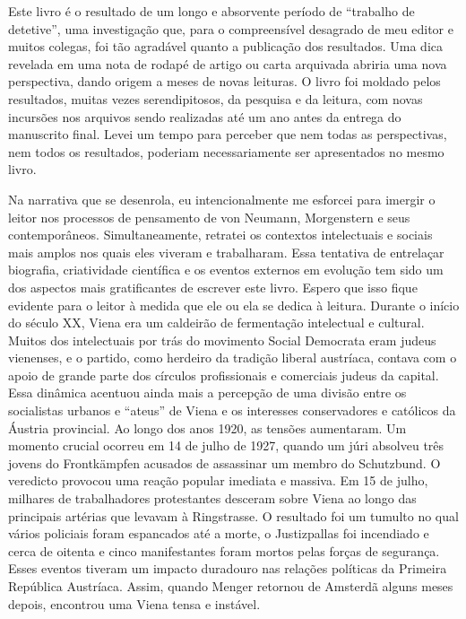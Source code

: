\documentclass[a4paper,12pt]{article}[abntex2]
\begin{document}
Este livro é o resultado de um longo e absorvente período de “trabalho de detetive”, uma investigação que, para o compreensível desagrado de meu editor e muitos colegas, foi tão agradável quanto a publicação dos resultados. Uma dica revelada em uma nota de rodapé de artigo ou carta arquivada abriria uma nova perspectiva, dando origem a meses de novas leituras. O livro foi moldado pelos resultados, muitas vezes serendipitosos, da pesquisa e da leitura, com novas incursões nos arquivos sendo realizadas até um ano antes da entrega do manuscrito final. Levei um tempo para perceber que nem todas as perspectivas, nem todos os resultados, poderiam necessariamente ser apresentados no mesmo livro.

Na narrativa que se desenrola, eu intencionalmente me esforcei para imergir o leitor nos processos de pensamento de von Neumann, Morgenstern e seus contemporâneos. Simultaneamente, retratei os contextos intelectuais e sociais mais amplos nos quais eles viveram e trabalharam. Essa tentativa de entrelaçar biografia, criatividade científica e os eventos externos em evolução tem sido um dos aspectos mais gratificantes de escrever este livro. Espero que isso fique evidente para o leitor à medida que ele ou ela se dedica à leitura. Durante o início do século XX, Viena era um caldeirão de fermentação intelectual e cultural. Muitos dos intelectuais por trás do movimento Social Democrata eram judeus vienenses, e o partido, como herdeiro da tradição liberal austríaca, contava com o apoio de grande parte dos círculos profissionais e comerciais judeus da capital. Essa dinâmica acentuou ainda mais a percepção de uma divisão entre os socialistas urbanos e “ateus” de Viena e os interesses conservadores e católicos da Áustria provincial. Ao longo dos anos 1920, as tensões aumentaram. Um momento crucial ocorreu em 14 de julho de 1927, quando um júri absolveu três jovens do Frontkämpfen acusados de assassinar um membro do Schutzbund. O veredicto provocou uma reação popular imediata e massiva. Em 15 de julho, milhares de trabalhadores protestantes desceram sobre Viena ao longo das principais artérias que levavam à Ringstrasse. O resultado foi um tumulto no qual vários policiais foram espancados até a morte, o Justizpallas foi incendiado e cerca de oitenta e cinco manifestantes foram mortos pelas forças de segurança. Esses eventos tiveram um impacto duradouro nas relações políticas da Primeira República Austríaca. Assim, quando Menger retornou de Amsterdã alguns meses depois, encontrou uma Viena tensa e instável.
\end{document}
